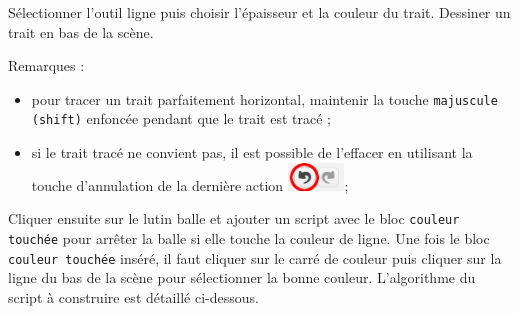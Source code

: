 
Sélectionner l'outil ligne  puis choisir l'épaisseur  et la couleur  du trait. Dessiner un trait  en bas de la scène. 

\vspace{12pt}

Remarques :
\begin{itemize}
\item pour tracer un trait parfaitement horizontal, maintenir la touche \texttt{majuscule (shift)} enfoncée pendant que le trait est tracé ;
\item si le trait tracé ne convient pas, il est possible de l'effacer en utilisant la touche d'annulation de la dernière action \includegraphics[width=1.5cm]{./images/scratch02/Pong12bis};
\end{itemize}


\vspace{12pt}

Cliquer ensuite sur le lutin balle et ajouter un script avec le bloc \texttt{couleur touchée} pour arrêter la balle si elle touche la couleur de ligne. Une fois le bloc \texttt{couleur touchée} inséré, il faut cliquer sur le carré de couleur puis cliquer sur la ligne du bas de la scène pour sélectionner la bonne couleur. L'algorithme du script à construire est détaillé ci-dessous.








